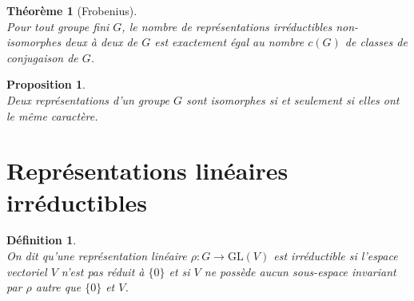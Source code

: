 \documentclass[a4paper, 14pt]{report}
\newtheorem{definition}{Définition}[section]
\newtheorem{proposition}{Proposition}[section]
\newtheorem{theorem}{Théorème}[section]
\begin{document}
\begin{onehalfspace}
{			
			\begin{theorem}[Frobenius] \cite{serre1971representation} \\
				Pour tout groupe fini \( G \), le nombre de représentations irréductibles non-isomorphes deux à deux de \( G \) est exactement égal au nombre \( c(G) \) de classes de conjugaison de \( G \).
			\end{theorem}
			
			\begin{proposition} \cite{renard2009groupes}\\
				Deux représentations d’un groupe \( G \) sont isomorphes si et seulement si elles ont le même caractère.
			\end{proposition}
			
			\section{Représentations linéaires irréductibles}
			\begin{definition}  \cite{serre1971representation} \\
				On dit qu'une représentation linéaire \( \rho : G \rightarrow \mathrm{GL}(V) \) est \emph{irréductible} si l'espace vectoriel \( V \) n'est pas réduit à \( \{0\} \) et si \( V \) ne possède aucun sous-espace invariant par \( \rho \) autre que \( \{0\} \) et \( V \).	
			\end{definition}
			
}
\end{onehalfspace}
\end{document}

